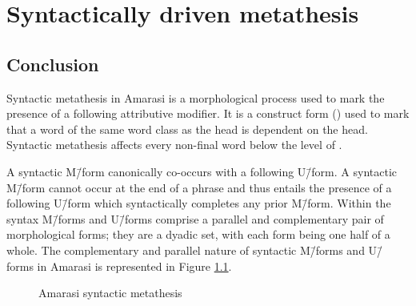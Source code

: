 \chapter{Syntactically driven metathesis}\label{ch:SynMet}




	
	
	
	
	

	
	
	




\section{Conclusion}
Syntactic metathesis in Amarasi is a morphological process
used to mark the presence of a following attributive modifier.
It is a construct form () used to mark that a word
of the same word class as the head is dependent on the head.
Syntactic metathesis affects every non-final word below the level of .

A syntactic M\=/form canonically co-occurs with a following U\=/form.
A syntactic M\=/form cannot occur at the end of a phrase
and thus entails the presence of a following U\=/form
which syntactically completes any prior M\=/form.
Within the syntax M\=/forms and U\=/forms
comprise a parallel and complementary pair of morphological forms;
they are a dyadic set, with each form being one half of a whole.
The complementary and parallel nature of syntactic M\=/forms and U\=/forms
in Amarasi is represented in Figure \ref{fig:AmaSynMet}.

\begin{figure}[h]
	\caption{Amarasi syntactic metathesis}\label{fig:AmaSynMet}
\end{figure}